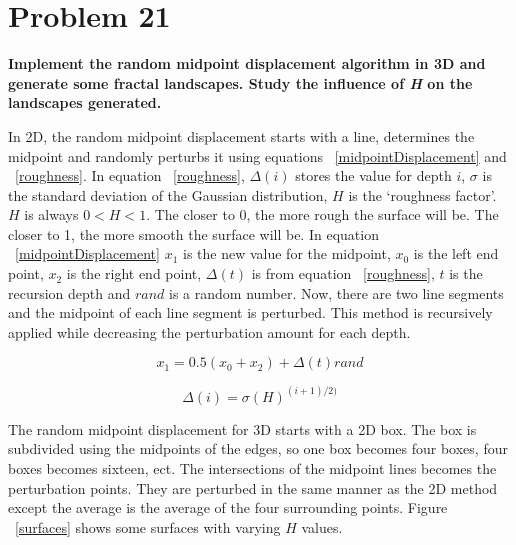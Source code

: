 \section{ Problem 21 }
\textbf{ Implement the random midpoint displacement algorithm in 3D and generate some fractal landscapes. Study the influence of \textit{H} on the landscapes generated. } \\
\newline

In 2D, the random midpoint displacement starts with a line, determines the midpoint and randomly perturbs it using equations ~\ref{midpointDisplacement} and ~\ref{roughness}. In equation ~\ref{roughness}, $\Delta(i)$ stores the value for depth $i$, $\sigma$ is the standard deviation of the Gaussian distribution, $H$ is the `roughness factor'. $H$ is always $ 0 < H < 1$. The closer to 0, the more rough the surface will be. The closer to 1, the more smooth the surface will be.  In equation ~\ref{midpointDisplacement} $x_1$ is the new value for the midpoint, $x_0$ is the left end point, $x_2$ is the right end point, $\Delta(t)$ is  from equation ~\ref{roughness}, $t$ is the recursion depth and $rand$ is a random number. Now, there are two line segments and the midpoint of each line segment is perturbed. This method is recursively applied while decreasing the perturbation amount for each depth. 

\begin{equation}
x_1 = 0.5 ( x_0 + x_2 ) + \Delta(t)  rand
\end{equation} \label{midpointDisplacement}

\begin{equation}
\Delta(i) = \sigma (H)^{(i+1)/2)}
\end{equation} \label{roughness}

The random midpoint displacement for 3D starts with a 2D box. The box is subdivided using the midpoints of the edges, so one box becomes four boxes, four boxes becomes sixteen, ect. The intersections of the midpoint lines becomes the perturbation points. They are perturbed in the same manner as the 2D method except the average is the average of the four surrounding points. Figure ~\ref{surfaces} shows some surfaces with varying $H$ values.



